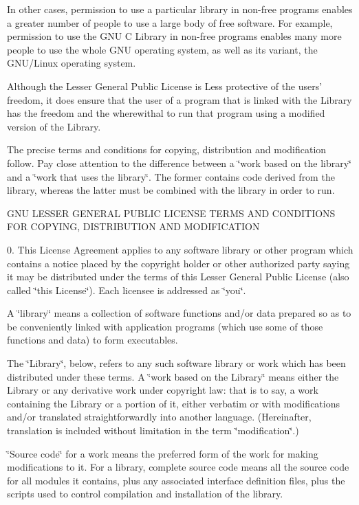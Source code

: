 In other cases, permission to use a particular library in non-free programs enables a greater number of people to use a large body of free software. For example, permission to use the GNU C Library in non-free programs enables many more people to use the whole GNU operating system, as well as its variant, the GNU/Linux operating system.

Although the Lesser General Public License is Less protective of the users' freedom, it does ensure that the user of a program that is linked with the Library has the freedom and the wherewithal to run that program using a modified version of the Library.

The precise terms and conditions for copying, distribution and modification follow. Pay close attention to the difference between a \char`\"{}work based on the library\char`\"{} and a \char`\"{}work that uses the library\char`\"{}. The former contains code derived from the library, whereas the latter must be combined with the library in order to run.

GNU LESSER GENERAL PUBLIC LICENSE TERMS AND CONDITIONS FOR COPYING, DISTRIBUTION AND MODIFICATION

0. This License Agreement applies to any software library or other program which contains a notice placed by the copyright holder or other authorized party saying it may be distributed under the terms of this Lesser General Public License (also called \char`\"{}this License\char`\"{}). Each licensee is addressed as \char`\"{}you\char`\"{}.

A \char`\"{}library\char`\"{} means a collection of software functions and/or data prepared so as to be conveniently linked with application programs (which use some of those functions and data) to form executables.

The \char`\"{}Library\char`\"{}, below, refers to any such software library or work which has been distributed under these terms. A \char`\"{}work based on the Library\char`\"{} means either the Library or any derivative work under copyright law: that is to say, a work containing the Library or a portion of it, either verbatim or with modifications and/or translated straightforwardly into another language. (Hereinafter, translation is included without limitation in the term \char`\"{}modification\char`\"{}.)

\char`\"{}Source code\char`\"{} for a work means the preferred form of the work for making modifications to it. For a library, complete source code means all the source code for all modules it contains, plus any associated interface definition files, plus the scripts used to control compilation and installation of the library.

